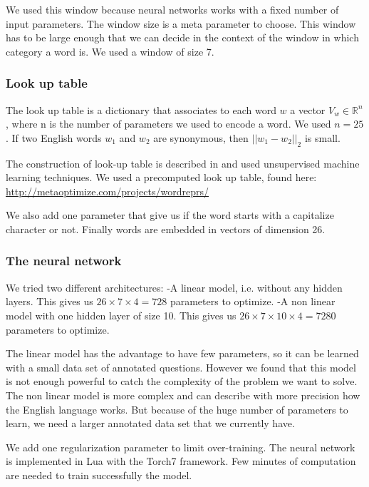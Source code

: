 We used this window because neural networks works with a fixed number of input parameters. 
The window size is a meta parameter to choose. This window has to be large enough that we can decide in the context of the window in which category a word is. We used a window of size 7.

\subsubsection{Look up table}

The look up table is a dictionary that associates to each word $w$ a vector $V_w \in \mathbb{R}^n$, where n is the number of parameters we used to encode a word. We used $n=25$.
If two English words $w_1$ and $w_2$ are synonymous, then $||w_1-w_2||_2$ is small.

The construction of look-up table is described in \cite{collobert} and used unsupervised machine learning techniques.
We used a precomputed look up table, found here: \url{http://metaoptimize.com/projects/wordreprs/}

We also add one parameter that give us if the word starts with a capitalize character or not. Finally words are embedded in vectors of dimension 26. 

\subsubsection{The neural network}

We tried two different architectures:
-A linear model, i.e. without any hidden layers. This gives us $26\times 7\times 4 = 728$ parameters to optimize. 
-A non linear model with one hidden layer of size 10. This gives us $26\times 7\times 10\times 4 = 7280$ parameters to optimize.

The linear model has the advantage to have few parameters, so it can be learned with a small data set of annotated questions. However we found that this model is not enough powerful to catch the complexity of the problem we want to solve.
The non linear model is more complex and can describe with more precision how the English language works. But because of the huge number of parameters to learn, we need a larger annotated data set that we currently have.

We add one regularization parameter to limit over-training.
The neural network is implemented in Lua with the Torch7 framework.
Few minutes of computation are needed to train successfully the model.

